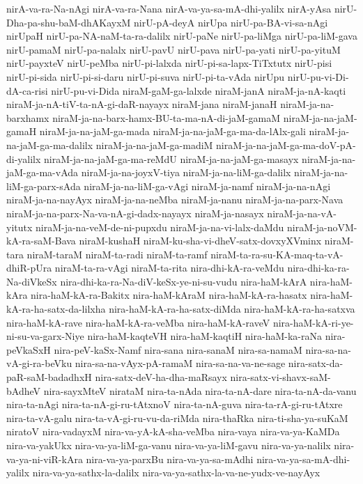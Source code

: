 {nirA-va-ra-Na-nAgi
nirA-va-ra-Nana
nirA-va-ya-sa-mA-dhi-yalilx
nirA-yAsa
nirU-Dha-pa-shu-baM-dhAKayxM
nirU-pA-deyA
nirUpa
nirU-pa-BA-vi-sa-nAgi
nirUpaH
nirU-pa-NA-naM-ta-ra-dalilx
nirU-paNe
nirU-pa-liMga
nirU-pa-liM-gava
nirU-pamaM
nirU-pa-nalalx
nirU-pavU
nirU-pava
nirU-pa-yati
nirU-pa-yituM
nirU-payxteV
nirU-peMba
nirU-pi-lalxda
nirU-pi-sa-lapx-TiTxtutx
nirU-pisi
nirU-pi-sida
nirU-pi-si-daru
nirU-pi-suva
nirU-pi-ta-vAda
nirUpu
nirU-pu-vi-Di-dA-ca-risi
nirU-pu-vi-Dida
niraM-gaM-ga-lalxde
niraM-janA
niraM-ja-nA-kaqti
niraM-ja-nA-tiV-ta-nA-gi-daR-nayayx
niraM-jana
niraM-janaH
niraM-ja-na-barxhamx
niraM-ja-na-barx-hamx-BU-ta-ma-nA-di-jaM-gamaM
niraM-ja-na-jaM-gamaH
niraM-ja-na-jaM-ga-mada
niraM-ja-na-jaM-ga-ma-da-lAlx-gali
niraM-ja-na-jaM-ga-ma-dalilx
niraM-ja-na-jaM-ga-madiM
niraM-ja-na-jaM-ga-ma-doV-pA-di-yalilx
niraM-ja-na-jaM-ga-ma-reMdU
niraM-ja-na-jaM-ga-masayx
niraM-ja-na-jaM-ga-ma-vAda
niraM-ja-na-joyxV-tiya
niraM-ja-na-liM-ga-dalilx
niraM-ja-na-liM-ga-parx-sAda
niraM-ja-na-liM-ga-vAgi
niraM-ja-namf
niraM-ja-na-nAgi
niraM-ja-na-nayAyx
niraM-ja-na-neMba
niraM-ja-nanu
niraM-ja-na-parx-Nava
niraM-ja-na-parx-Na-va-nA-gi-dadx-nayayx
niraM-ja-nasayx
niraM-ja-na-vA-yitutx
niraM-ja-na-veM-de-ni-pupxdu
niraM-ja-na-vi-lalx-daMdu
niraM-ja-noVM-kA-ra-saM-Bava
niraM-kushaH
niraM-ku-sha-vi-dheV-satx-dovxyXVminx
niraM-tara
niraM-taraM
niraM-ta-radi
niraM-ta-ramf
niraM-ta-ra-su-KA-maq-ta-vA-dhiR-pUra
niraM-ta-ra-vAgi
niraM-ta-rita
nira-dhi-kA-ra-veMdu
nira-dhi-ka-ra-Na-diVkeSx
nira-dhi-ka-ra-Na-diV-keSx-ye-ni-su-vudu
nira-haM-kArA
nira-haM-kAra
nira-haM-kA-ra-Bakitx
nira-haM-kAraM
nira-haM-kA-ra-hasatx
nira-haM-kA-ra-ha-satx-da-lilxha
nira-haM-kA-ra-ha-satx-diMda
nira-haM-kA-ra-ha-satxva
nira-haM-kA-rave
nira-haM-kA-ra-veMba
nira-haM-kA-raveV
nira-haM-kA-ri-ye-ni-su-va-garx-Niye
nira-haM-kaqteVH
nira-haM-kaqtiH
nira-haM-ka-raNa
nira-peVkaSxH
nira-peV-kaSx-Namf
nira-sana
nira-sanaM
nira-sa-namaM
nira-sa-na-vA-gi-ra-beVku
nira-sa-na-vAyx-pA-ramaM
nira-sa-na-va-ne-sage
nira-satx-da-paR-saM-badadhxH
nira-satx-deV-ha-dha-maRsayx
nira-satx-vi-shavx-saM-bAdheV
nira-sayxMteV
nirataM
nira-ta-nAda
nira-ta-nA-dare
nira-ta-nA-da-vanu
nira-ta-nAgi
nira-ta-nA-gi-ru-tAtxnoV
nira-ta-nA-guva
nira-ta-rA-gi-ru-tAtxre
nira-ta-vA-galu
nira-ta-vA-gi-ru-vu-da-riMda
nira-thaRka
nira-ti-sha-ya-suKaM
niratoV
nira-vadayxM
nira-va-yA-kA-sha-veMba
nira-vaya
nira-va-ya-KaMDa
nira-va-yakUkx
nira-va-ya-liM-ga-vanu
nira-va-ya-liM-gavu
nira-va-ya-nalilx
nira-va-ya-ni-viR-kAra
nira-va-ya-parxBu
nira-va-ya-sa-mAdhi
nira-va-ya-sa-mA-dhi-yalilx
nira-va-ya-sathx-la-dalilx
nira-va-ya-sathx-la-va-ne-yudx-ve-nayAyx
}
